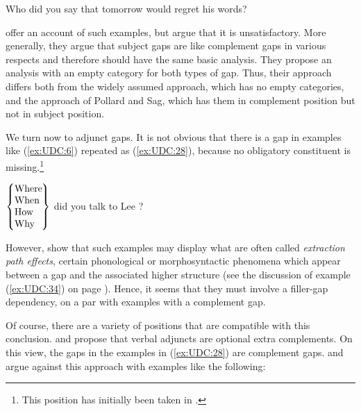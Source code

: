 \documentclass[output=paper,biblatex,babelshorthands,newtxmath,draftmode,colorlinks,citecolor=brown]{langscibook}
\begin{document}
\begin{exe}
\ex \label{ex:UDC:27}
Who did you say that tomorrow \trace{} would regret his words?
\end{exe}

\noindent
\citet[Chapter~5.1.3]{Ginzburg:Sag:01} offer an account of such examples, but
\citet[Chapter~2.3.2]{Levine:Hukari:06} argue that it is unsatisfactory. More generally, they
argue that subject gaps are like complement gaps in various respects
and therefore should have the same basic analysis. They propose an
analysis with an empty category for both types of gap. Thus, their
approach differs both from the widely assumed approach, which has no
empty categories, and the approach of Pollard and Sag, which has them
in complement position but not in subject position.\label{udc:page-subject-gaps-end}

We turn now to adjunct gaps. It is not obvious that there is a gap in
examples like (\ref{ex:UDC:6}) repeated as (\ref{ex:UDC:28}), because
no obligatory constituent is missing.\footnote{This position has initially
  been taken in \citet[176--180]{Pollard:Sag:94}. } 

\ea
\label{ex:UDC:28}
$\begin{array}{@{}l@{}}
\left\{%
\begin{tabular}{@{}l@{}}
  Where\hspace{-.09em}\mbox{}\\
  When\\
  How\\
  Why\\
\end{tabular}\right\}
\end{array}$
did you talk to Lee \trace{}?
\z

\noindent
However, \cite{hukari.levine:adjunct} show that such examples may display
what are often called \emph{extraction path effects}, certain phonological or
morphosyntactic phenomena which appear between a gap and the associated
higher structure (see the discussion of example (\ref{ex:UDC:34}) on
page \pageref{ex:UDC:34}). Hence, it seems that they must
involve a filler-gap dependency, on a par with examples with a
complement gap.

Of course, there are a variety of positions that are compatible with
this conclusion. \citet[]{Bouma:Malouf:Sag:01} and \citet[168,
fn.~2]{Ginzburg:Sag:01} propose that verbal adjuncts are optional
extra complements.  On this view, the gaps in the examples in
(\ref{ex:UDC:28}) are complement gaps.  \citet{Levine:03} and
\citet[Chapter~3.5--3.6]{Levine:Hukari:06} argue against this approach with examples
like the following:
\end{document}
